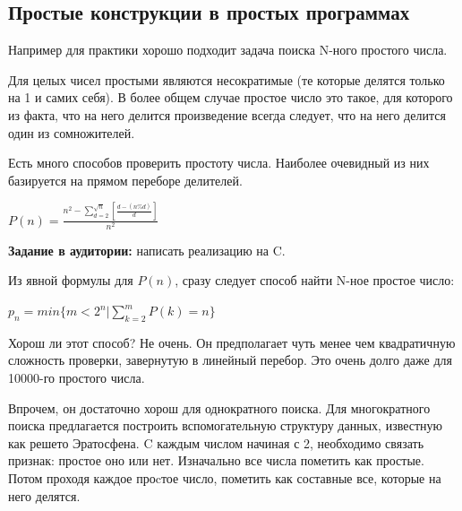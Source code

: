 \documentclass[a4paper,12pt,oneside]{book}
\newif\ifanswers
\begin{document}
\subsection{Простые конструкции в простых программах}

Например для практики хорошо подходит задача поиска N-ного простого числа.

Для целых чисел простыми являются несократимые (те которые делятся только на 1 и самих себя). В более общем случае простое число это такое, для которого из факта, что на него делится произведение всегда следует, что на него делится один из сомножителей.

Есть много способов проверить простоту числа. Наиболее очевидный из них базируется на прямом переборе делителей. 

$P(n)=\frac{n^2-\sum\limits_{d=2}^{\sqrt{n}} [\frac{d-(n\%d)}{d}]}{n^2}$

\textbf{Задание в аудитории:} написать реализацию на C.

\ifanswers
Возможный ответ:

\begin{lstlisting}
int
is_prime(unsigned long long nxt)
{
  unsigned r, f;

  if (nxt == 1) return 0;
  if (nxt < 4) return 1;
  if ((nxt % 2) == 0) return 0;
  if (nxt < 9) return 1;
  if ((nxt % 3) == 0) return 0;
  
  r = (unsigned) sqrt ((double)nxt);
  f = 5;

  while (f <= r)
    {
      if ((nxt % f) == 0) return 0;
      if ((nxt % (f + 2)) == 0) return 0;
      f += 6;
    }

  return 1;
}
\end{lstlisting}
\fi

Из явной формулы для $P(n)$, сразу следует способ найти N-ное простое число:

$p_n=min\{m<2^n|\sum\limits_{k=2}^{m}P(k)=n\}$

Хорош ли этот способ? Не очень. Он предполагает чуть менее чем квадратичную сложность проверки, завернутую в линейный перебор. Это очень долго даже для 10000-го простого числа.

Впрочем, он достаточно хорош для однократного поиска. Для многократного поиска предлагается построить вспомогательную структуру данных, известную как решето Эратосфена. C каждым числом начиная с 2, необходимо связать признак: простое оно или нет. Изначально все числа пометить как простые. Потом проходя каждое проcтое число, пометить как составные все, которые на него делятся.
\end{document}
